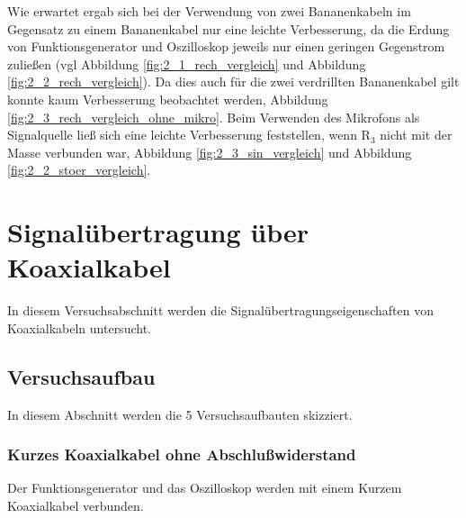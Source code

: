 \documentclass[12pt,a4paper]{article}
\begin{document}
Wie erwartet ergab sich bei der Verwendung von zwei Bananenkabeln im Gegensatz zu einem Bananenkabel nur eine leichte Verbesserung, da die Erdung von Funktionsgenerator und Oszilloskop jeweils nur einen geringen Gegenstrom zuließen (vgl Abbildung \ref{fig:2_1_rech_vergleich} und Abbildung \ref{fig:2_2_rech_vergleich}).
Da dies auch für die zwei verdrillten Bananenkabel gilt konnte kaum Verbesserung beobachtet werden, Abbildung \ref{fig:2_3_rech_vergleich_ohne_mikro}. Beim Verwenden des Mikrofons als Signalquelle ließ sich eine leichte Verbesserung feststellen, wenn R$_3$ nicht mit der Masse verbunden war, Abbildung \ref{fig:2_3_sin_vergleich} und Abbildung \ref{fig:2_2_stoer_vergleich}.


\section{Signalübertragung über Koaxialkabel}

In diesem Versuchsabschnitt werden die Signalübertragungseigenschaften von Koaxialkabeln untersucht.

\subsection{Versuchsaufbau}

In diesem Abschnitt werden die 5 Versuchsaufbauten skizziert.

\subsubsection{Kurzes Koaxialkabel ohne Abschlußwiderstand}

Der Funktionsgenerator und das Oszilloskop werden mit einem Kurzem Koaxialkabel verbunden.
\end{document}

